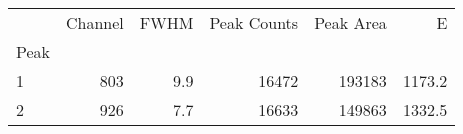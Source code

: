 \begin{tabular}{lrrrrr}
\toprule
{} &  Channel &  FWHM &  Peak Counts &  Peak Area &       E \\
Peak &          &       &              &            &         \\
\midrule
1    &      803 &   9.9 &        16472 &     193183 &  1173.2 \\
2    &      926 &   7.7 &        16633 &     149863 &  1332.5 \\
\bottomrule
\end{tabular}
